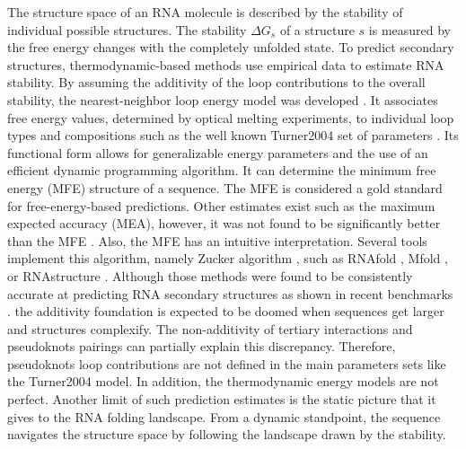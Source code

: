 \documentclass[a4paper,12pt]{article}
\begin{document}
The structure space of an RNA molecule is described by the stability of
individual possible structures. The stability \(\Delta G_s\) of a structure \(s\) is
measured by the free energy changes with the completely unfolded state. To
predict secondary structures, thermodynamic-based methods use empirical data to
estimate RNA stability. By assuming the additivity \cite{dill97_addit_princ_bioch}
of the loop contributions to the overall stability, the nearest-neighbor loop
energy model was developed \cite{turner09_nndb}. It associates free energy values,
determined by optical melting experiments, to individual loop types and
compositions such as the well known Turner2004 set of parameters
\cite{mathews04_incor_chemic_modif_const_into}. Its functional form allows for
generalizable energy parameters and the use of an efficient dynamic programming
algorithm. It can determine the minimum free energy (MFE) structure of a
sequence. The MFE is considered a gold standard for free-energy-based
predictions. Other estimates exist such as the maximum expected accuracy (MEA),
however, it was not found to be significantly better than the MFE
\cite{mathews19_how_to_bench_rna_secon}. Also, the MFE has an intuitive
interpretation. Several tools implement this algorithm, namely Zucker algorithm
\cite{zuker81_optim_comput_foldin_large_rna}, such as RNAfold
\cite{hofacker03_vienn_rna_secon_struc_server}, Mfold
\cite{zuker03_mfold_web_server_nucleic_acid}, or RNAstructure \cite{reuter10_rnast}.
Although those methods were found to be consistently accurate at predicting RNA
secondary structures as shown in recent benchmarks
\cite{sato20_rna,huang19_linear}. the additivity foundation is expected to be
doomed when sequences get larger and structures complexify. The non-additivity
of tertiary interactions and pseudoknots pairings can partially explain this
discrepancy. Therefore, pseudoknots loop contributions are not defined in the
main parameters sets like the Turner2004 model. In addition, the thermodynamic
energy models are not perfect. Another limit of such prediction estimates is the
static picture that it gives to the RNA folding landscape. From a dynamic
standpoint, the sequence navigates the structure space by following the
landscape drawn by the stability.
\end{document}
